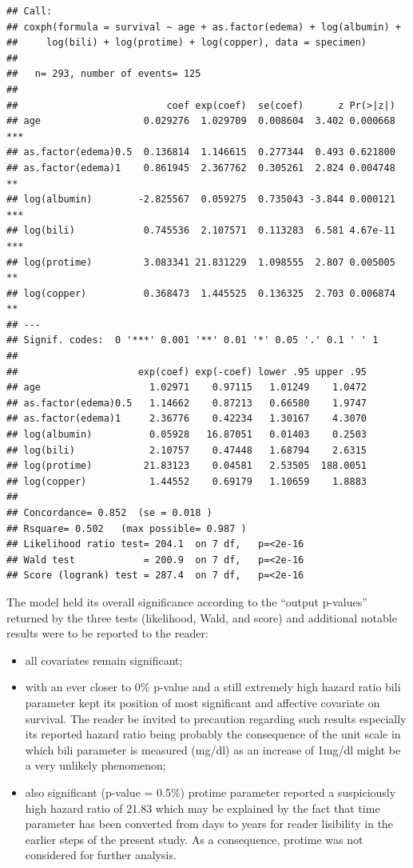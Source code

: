 \documentclass[]{article}
\providecommand{\tightlist}{%
  \setlength{\itemsep}{0pt}\setlength{\parskip}{0pt}}
\begin{document}
\begin{verbatim}
## Call:
## coxph(formula = survival ~ age + as.factor(edema) + log(albumin) + 
##     log(bili) + log(protime) + log(copper), data = specimen)
## 
##   n= 293, number of events= 125 
## 
##                          coef exp(coef)  se(coef)      z Pr(>|z|)    
## age                  0.029276  1.029709  0.008604  3.402 0.000668 ***
## as.factor(edema)0.5  0.136814  1.146615  0.277344  0.493 0.621800    
## as.factor(edema)1    0.861945  2.367762  0.305261  2.824 0.004748 ** 
## log(albumin)        -2.825567  0.059275  0.735043 -3.844 0.000121 ***
## log(bili)            0.745536  2.107571  0.113283  6.581 4.67e-11 ***
## log(protime)         3.083341 21.831229  1.098555  2.807 0.005005 ** 
## log(copper)          0.368473  1.445525  0.136325  2.703 0.006874 ** 
## ---
## Signif. codes:  0 '***' 0.001 '**' 0.01 '*' 0.05 '.' 0.1 ' ' 1
## 
##                     exp(coef) exp(-coef) lower .95 upper .95
## age                   1.02971    0.97115   1.01249    1.0472
## as.factor(edema)0.5   1.14662    0.87213   0.66580    1.9747
## as.factor(edema)1     2.36776    0.42234   1.30167    4.3070
## log(albumin)          0.05928   16.87051   0.01403    0.2503
## log(bili)             2.10757    0.47448   1.68794    2.6315
## log(protime)         21.83123    0.04581   2.53505  188.0051
## log(copper)           1.44552    0.69179   1.10659    1.8883
## 
## Concordance= 0.852  (se = 0.018 )
## Rsquare= 0.502   (max possible= 0.987 )
## Likelihood ratio test= 204.1  on 7 df,   p=<2e-16
## Wald test            = 200.9  on 7 df,   p=<2e-16
## Score (logrank) test = 287.4  on 7 df,   p=<2e-16
\end{verbatim}

The model held its overall significance according to the ``output
p-values'' returned by the three tests (likelihood, Wald, and score) and
additional notable results were to be reported to the reader:

\begin{itemize}
\tightlist
\item
  all covariates remain significant;
\item
  with an ever closer to 0\% p-value and a still extremely high hazard
  ratio bili parameter kept its position of most significant and
  affective covariate on survival. The reader be invited to precaution
  regarding such results especially its reported hazard ratio being
  probably the consequence of the unit scale in which bili parameter is
  measured (mg/dl) as an increase of 1mg/dl might be a very unlikely
  phenomenon;
\item
  also significant (p-value = 0.5\%) protime parameter reported a
  suspiciously high hazard ratio of 21.83 which may be explained by the
  fact that time parameter has been converted from days to years for
  reader lisibility in the earlier steps of the present study. As a
  consequence, protime was not considered for further analysis.
\end{itemize}
\end{document}
